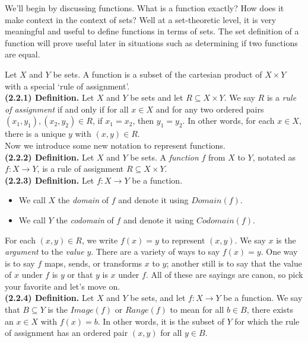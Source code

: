 \documentclass[12pt]{book}
\begin{document}
We'll begin by discussing functions. What is a function exactly? How does it make context in the context of sets? Well at a set-theoretic level, it is very meaningful and useful to define functions in terms of sets. The set definition of a function will prove useful later in situations such as determining if two functions are equal.

Let $X$ and $Y$ be sets. A function is a subset of the cartesian product of $X\times Y$ with a special `rule of assignment'.\\

\noindent\textbf{(2.2.1) Definition.} Let $X$ and $Y$ be sets and let $R\subseteq X\times Y$. We say $R$ is a \textit{rule of assignment} if and only if for all $x\in X$ and for any two ordered pairs $(x_1,y_1),(x_2,y_2)\in R$, if $x_1=x_2$, then $y_1=y_2$. In other words, for each $x\in X$, there is a unique $y$ with $(x,y)\in R$. \\

Now we introduce some new notation to represent functions.\\

\noindent\textbf{(2.2.2) Definition.} Let $X$ and $Y$ be sets. A \textit{function} $f$ from $X$ to $Y$, notated as $f\colon X\rightarrow Y$, is a rule of assignment $R\subseteq X\times Y$. \\

\noindent\textbf{(2.2.3) Definition.} Let $f:X\rightarrow Y$ be a function. 
\begin{itemize}
\item We call $X$ the \textit{domain} of $f$ and denote it using $Domain(f)$.
\item We call $Y$ the \textit{codomain} of $f$ and denote it using $Codomain(f)$.
\end{itemize}

For each $(x,y)\in R$, we write $f(x)=y$ to represent $(x,y)$. We say $x$ is the \textit{argument} to the \textit{value} $y$. There are a variety of ways to say $f(x)=y$. One way is to say $f$ maps, sends, or transforms $x$ to $y$; another still is to say that the value of $x$ under $f$ is $y$ or that $y$ is $x$ under $f$. All of these are sayings are canon, so pick your favorite and let's move on. \\

\noindent\textbf{(2.2.4) Definition.} Let $X$ and $Y$ be sets, and let $f\colon X\rightarrow Y$ be a function. We say that $B\subseteq Y$ is the $Image(f)$ or $Range(f)$ to mean for all $b\in B$, there exists an $x\in X$ with $f(x)=b$. In other words, it is the subset of $Y$ for which the rule of assignment has an ordered pair $(x,y)$ for all $y\in B$.\\
\end{document}
